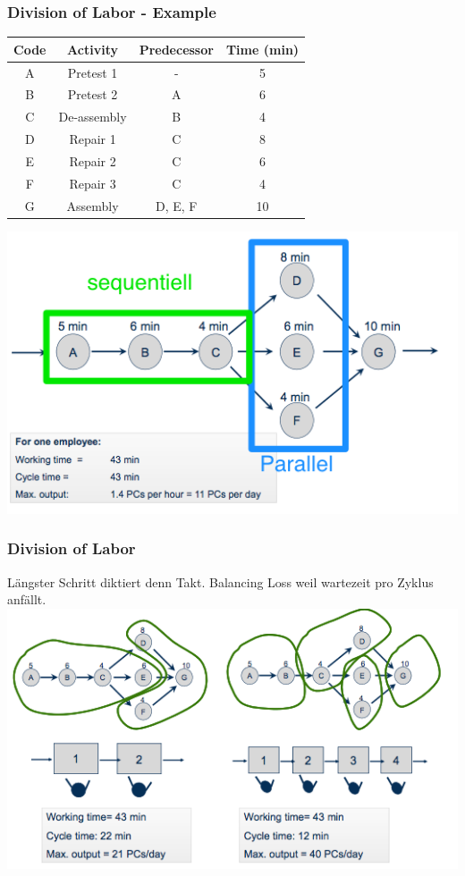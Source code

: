 \subsubsection{Division of Labor - Example}
\begin{center}
\begin{tabular}{|c|c|c|c|}
\hline Code & Activity & Predecessor & Time (min)\\ 
\hline A & Pretest  1&  - & 5\\ 
\hline B & Pretest 2 & A & 6\\ 
\hline C & De-assembly & B & 4\\ 
\hline D & Repair 1 & C & 8\\ 
\hline E & Repair 2 & C & 6\\ 
\hline F & Repair 3 & C & 4\\ 
\hline G & Assembly & D, E, F & 10\\ 
\hline
\end{tabular} 
\end{center} 
\includegraphics[width=1\textwidth]{W04/processmap}
\subsubsection{Division of Labor}
L\"angster Schritt diktiert denn Takt. Balancing Loss weil wartezeit pro Zyklus anf\"allt.\\
\includegraphics[width=1\textwidth]{W04/divisionoflabor}

